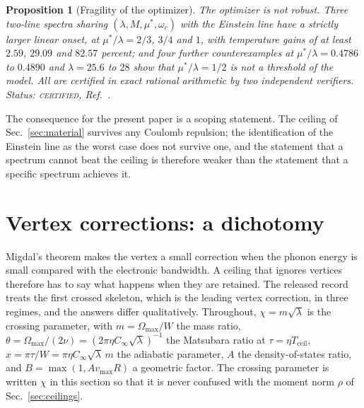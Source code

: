 \documentclass[aps,10pt,superscriptaddress,floatfix,amsmath,amssymb,nofootinbib]{revtex4-2}
\newcommand{\Cinf}{C_\infty}
\newcommand{\Tceil}{T_{\mathrm{ceil}}}
\newcommand{\muS}{\mu^{*}}
\newcommand{\CERT}{\textsc{certified}}
\newtheorem{proposition}{Proposition}
\begin{document}
\begin{proposition}[Fragility of the optimizer]\label{prop:fragile}
The optimizer is not robust. Three two-line spectra sharing $(\lambda,M,\muS,\omega_c)$ with
the Einstein line have a strictly larger linear onset, at $\muS/\lambda=2/3$, $3/4$ and $1$,
with temperature gains of at least $2.59$, $29.09$ and $82.57$ percent; and four further
counterexamples at $\muS/\lambda=0.4786$ to $0.4890$ and $\lambda=25.6$ to $28$ show that
$\muS/\lambda=1/2$ is not a threshold of the model. All are certified in exact rational
arithmetic by two independent verifiers.
Status: \CERT{}, Ref.~\cite{cutoff}.
\end{proposition}

The consequence for the present paper is a scoping statement. The ceiling of
Sec.~\ref{sec:material} survives any Coulomb repulsion; the identification of the Einstein
line as the worst case does not survive one, and the statement that a spectrum cannot beat
the ceiling is therefore weaker than the statement that a specific spectrum achieves it.

\section{Vertex corrections: a dichotomy}\label{sec:vertex}

Migdal's theorem makes the vertex a small correction when the phonon energy is small
compared with the electronic bandwidth. A ceiling that ignores vertices therefore has to
say what happens when they are retained. The released record treats the first crossed
skeleton, which is the leading vertex correction, in three regimes, and the answers differ
qualitatively. Throughout, $\chi=m\sqrt\lambda$ is the crossing parameter, with
$m=\Omega_{\max}/W$ the mass ratio, $\theta=\Omega_{\max}/(2\nu)=(2\pi\eta\Cinf\sqrt\lambda)^{-1}$
the Matsubara ratio at $\tau=\eta\Tceil$, $x=\pi\tau/W=\pi\eta\Cinf\sqrt\lambda\,m$ the
adiabatic parameter, $A$ the density-of-states ratio, and $B=\max(1,A v_{\max}R)$ a
geometric factor. The crossing parameter is written $\chi$ in this section so that it is
never confused with the moment norm $\rho$ of Sec.~\ref{sec:ceilings}.
\end{document}
